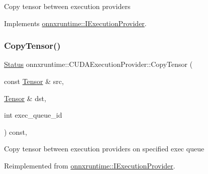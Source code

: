 Copy tensor between execution providers 

Implements \mbox{\hyperlink{classonnxruntime_1_1IExecutionProvider_a2b9bb47c0d2d72598ceb381688adfe26}{onnxruntime\+::\+I\+Execution\+Provider}}.

\mbox{\label{classonnxruntime_1_1CUDAExecutionProvider_a7238cead30fe69540b3df62e6913d579}} 
\subsubsection{\texorpdfstring{Copy\+Tensor()}{CopyTensor()}\hspace{0.1cm}{\footnotesize\ttfamily [2/2]}}
{\footnotesize\ttfamily \mbox{\hyperlink{classonnxruntime_1_1common_1_1Status}{Status}} onnxruntime\+::\+C\+U\+D\+A\+Execution\+Provider\+::\+Copy\+Tensor (\begin{DoxyParamCaption}\item[{const \mbox{\hyperlink{classonnxruntime_1_1Tensor}{Tensor}} \&}]{src,  }\item[{\mbox{\hyperlink{classonnxruntime_1_1Tensor}{Tensor}} \&}]{dst,  }\item[{int}]{exec\+\_\+queue\+\_\+id }\end{DoxyParamCaption}) const\hspace{0.3cm}{\ttfamily [override]}, {\ttfamily [virtual]}}

Copy tensor between execution providers on specified exec queue 

Reimplemented from \mbox{\hyperlink{classonnxruntime_1_1IExecutionProvider_ac72d136c6a46bb4f33c9a877e01cccaa}{onnxruntime\+::\+I\+Execution\+Provider}}.

\mbox{\label{classonnxruntime_1_1CUDAExecutionProvider_a01469a525b621ce14a85fcc8187847c4}} 
